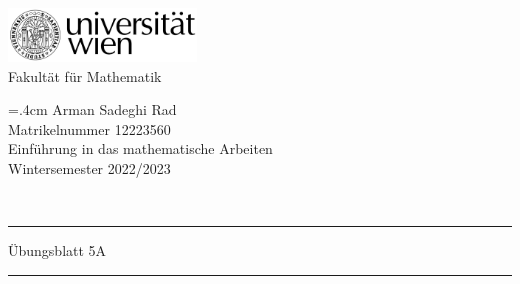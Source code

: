 \documentclass{article}
\theoremstyle{definition}
\begin{document}
	
	\thispagestyle{plain}
	\begin{minipage}{5cm}
		\includegraphics[width=5cm]{logo}\\
		\centering
		Fakultät für Mathematik
	\end{minipage}
	\hfill
	\begin{minipage}{7cm}
		\baselineskip=.4cm
		Arman Sadeghi Rad\\
		Matrikelnummer 12223560 \\
		Einführung in das mathematische Arbeiten \\
		Wintersemester 2022/2023
	\end{minipage}\\[1mm]
	\hrule height2pt \vskip1mm
	\noindent
	Übungsblatt 5A
	\hrule height2pt \vskip1mm
\end{document}
